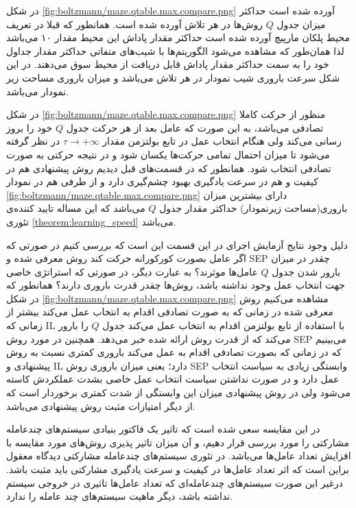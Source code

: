 در شکل
\ref{fig:boltzmann/maze.qtable.max.compare.png}
آورده شده است حداکثر میزان جدول $Q$ روش‌ها در هر تلاش آورده شده است. همانطور که قبلا در تعریف محیط پلکان مارپیچ آورده شده است حداکثر مقدار پاداش این محیط مقدار ۱۰ می‌باشد لذا همان‌طور که مشاهده می‌شود الگوریتم‌ها با شیب‌های متفاتی حداکثر مقدار جداول خود را به سمت حداکثر مقدار پاداش قابل دریافت از محیط سوق می‌دهند. در این شکل سرعت باروری شیب نمودار در هر تلاش می‌باشد و میزان باروری مساحت زیر نمودار می‌باشد.


در شکل
\ref{fig:boltzmann/maze.qtable.max.compare.png}
منظور از  حرکت کاملا تصادفی می‌باشد، به این صورت که عامل بعد از هر حرکت جدول $Q$ خود را بروز رسانی می‌کند ولی هنگام انتخاب عمل در تابع بولتزمن مقدار $\tau \rightarrow +\infty$ در نظر گرفته می‌شود تا میزان احتمال تمامی حرکت‌ها یکسان شود و در نتیجه حرکتی به صورت تصادفی انتخاب شود. همانطور که در قسمت‌های قبل دیدیم روش پیشنهادی هم در کیفیت و هم در سرعت یادگیری بهبود چشم‌گیری دارد و از طرفی هم در نمودار
\ref{fig:boltzmann/maze.qtable.max.compare.png}
دارای بیشترین میزان باروری(مساحت زیرنمودار) حداکثر مقدار جدول $Q$ می‌باشد که این مساله تایید کننده‌ی تئوری
\ref{theorem:learning_speed}
می‌باشد.

دلیل وجود نتایج آزمایش‌ اجرای  در این قسمت این است که بررسی کنیم در صورتی که اگر عامل بصورت کورکورانه حرکت کند روش‌ معرفی شده و SEP چقدر در میزان بارور شدن جدول $Q$ عامل‌ها موثرند؟ به عبارت دیگر، در صورتی که استراتژی خاصی جهت انتخاب عمل وجود نداشته باشد، روش‌ها چقدر قدرت باروری دارند؟ همانطور که در شکل
\ref{fig:boltzmann/maze.qtable.max.compare.png}
مشاهده می‌کنیم روش معرفی شده در زمانی که به صورت تصادفی اقدام به انتخاب عمل می‌کند بیشتر از زمانی که IL با استفاده از تابع بولتزمن اقدام به انتخاب عمل می‌کند جدول $Q$ را بارور می‌کند که از قدرت روش ارائه شده خبر می‌دهد. همچنین در مورد روش SEP می‌بینیم که در زمانی که بصورت تصادفی اقدام به عمل می‌کند باروری کمتری نسبت به روش پیشنهادی و IL دارد؛ یعنی میزان باروری روش SEP وابستگی زیادی به سیاست انتخاب عمل دارد و در صورت نداشتن سیاست انتخاب عمل خاصی بشدت عملکردش کاسته می‌شود ولی در روش پیشنهادی میزان این وابستگی از شدت کمتری برخوردار است که از دیگر امتیازات مثبت روش پیشنهادی می‌باشد.

 در این مقایسه سعی شده است که تاثیر یک فاکتور بنیادی سیستم‌های چندعامله مشارکتی را مورد بررسی قرار دهیم، و آن میزان تاثیر پذیری روش‌های مورد مقایسه با افزایش تعداد عامل‌ها می‌باشد. در تئوری سیستم‌های چندعامله مشارکتی دیدگاه معقول براین است که اثر تعداد عامل‌ها در کیفیت و سرعت یادگیری مشارکتی باید مثبت باشد. درغیر این صورت سیستم‌های چندعامله‌ای که تعداد عامل‌ها تاثیری در خروجی سیستم نداشته باشد، دیگر ماهیت سیستم‌های چند عامله را ندارد.


